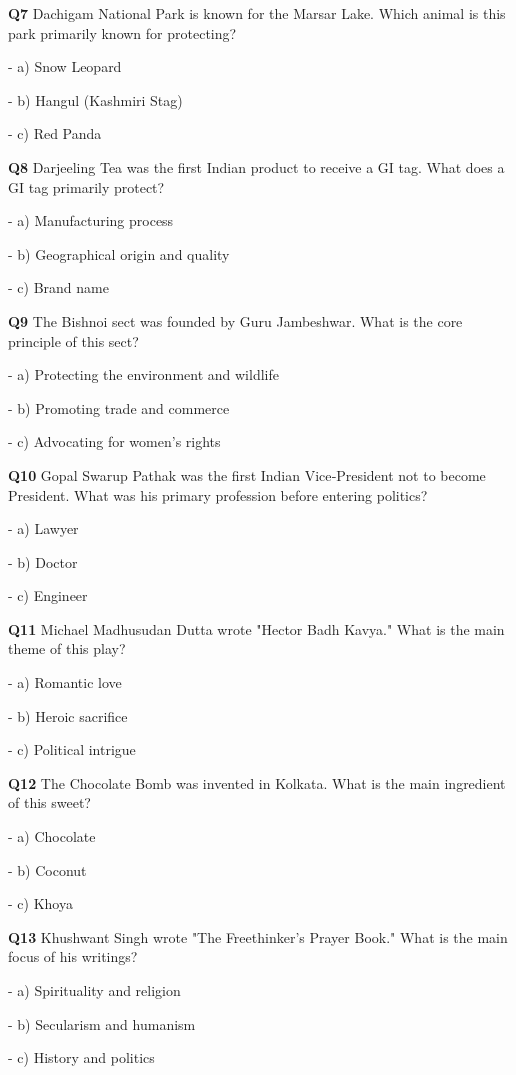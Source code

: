 \textbf{Q7} Dachigam National Park is known for the Marsar Lake. Which animal is this park primarily known for protecting?\par
\quad - a) Snow Leopard\par
\quad - b) Hangul (Kashmiri Stag)\par
\quad - c) Red Panda\par

\textbf{Q8} Darjeeling Tea was the first Indian product to receive a GI tag. What does a GI tag primarily protect?\par
\quad - a) Manufacturing process\par
\quad - b) Geographical origin and quality\par
\quad - c) Brand name\par

\textbf{Q9} The Bishnoi sect was founded by Guru Jambeshwar. What is the core principle of this sect?\par
\quad - a) Protecting the environment and wildlife\par
\quad - b) Promoting trade and commerce\par
\quad - c) Advocating for women's rights\par

\textbf{Q10} Gopal Swarup Pathak was the first Indian Vice‑President not to become President. What was his primary profession before entering politics?\par
\quad - a) Lawyer\par
\quad - b) Doctor\par
\quad - c) Engineer\par

\textbf{Q11} Michael Madhusudan Dutta wrote "Hector Badh Kavya." What is the main theme of this play?\par
\quad - a) Romantic love\par
\quad - b) Heroic sacrifice\par
\quad - c) Political intrigue\par

\textbf{Q12} The Chocolate Bomb was invented in Kolkata. What is the main ingredient of this sweet?\par
\quad - a) Chocolate\par
\quad - b) Coconut\par
\quad - c) Khoya\par

\textbf{Q13} Khushwant Singh wrote "The Freethinker's Prayer Book." What is the main focus of his writings?\par
\quad - a) Spirituality and religion\par
\quad - b) Secularism and humanism\par
\quad - c) History and politics\par

